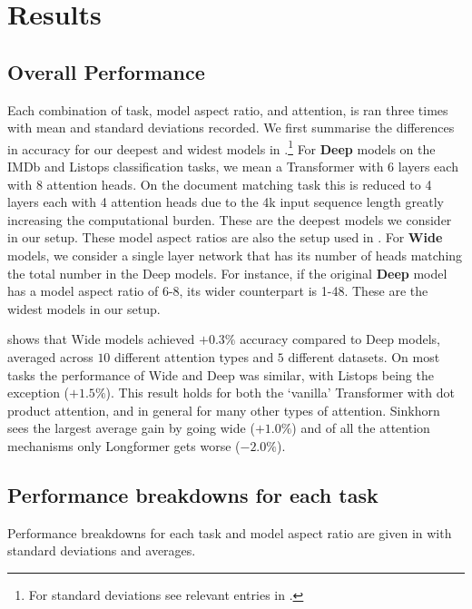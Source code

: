 \section{Results}\label{section:eval}


\subsection{Overall Performance}

Each combination of task, model aspect ratio, and attention, is ran three times with mean and standard deviations recorded.
We first summarise the differences in accuracy for our deepest and widest models in .\footnote{For standard deviations see relevant entries in .}
For \textbf{Deep} models on the IMDb and Listops classification tasks, we mean a Transformer with 6 layers each with 8 attention heads.
On the document matching task this is reduced to 4 layers each with 4 attention heads due to the 4k input sequence length greatly increasing the computational burden.
These are the deepest models we consider in our setup.
These model aspect ratios are also the setup used in \cite{lra}.
For \textbf{Wide} models, we consider a single layer network that has its number of heads matching the total number in the Deep models.
For instance, if the original \textbf{Deep} model has a model aspect ratio of 6-8, its wider counterpart is 1-48.
These are the widest models in our setup.

 shows that Wide models achieved $+0.3\%$ accuracy compared to Deep models, averaged across $10$ different attention types and $5$ different datasets.
On most tasks the performance of Wide and Deep was similar, with Listops being the exception ($+1.5\%$).
This result holds for both the `vanilla' Transformer with dot product attention, and in general for many other types of attention.
Sinkhorn sees the largest average gain by going wide ($+1.0\%$) and of all the attention mechanisms only Longformer gets worse ($-2.0\%$).
\subsection{Performance breakdowns for each task}

Performance breakdowns for each task and model aspect ratio are given in  with standard deviations and averages.

